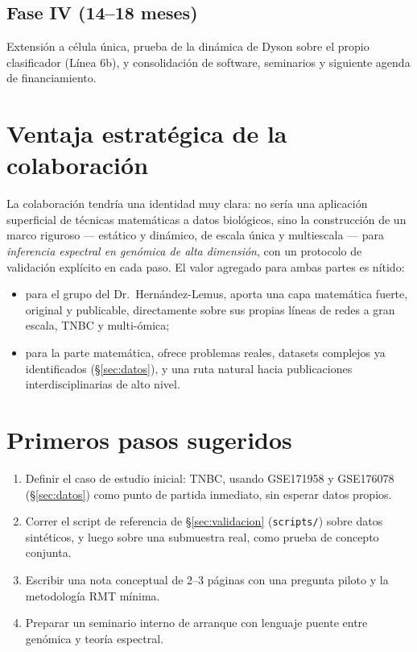 \documentclass[11pt]{article}
\begin{document}
\subsection*{Fase IV (14--18 meses)}
Extensión a célula única, prueba de la dinámica de Dyson sobre el propio clasificador (Línea 6b), y consolidación de software, seminarios y siguiente agenda de financiamiento.

\section{Ventaja estratégica de la colaboración}
La colaboración tendría una identidad muy clara: no sería una aplicación superficial de técnicas matemáticas a datos biológicos, sino la construcción de un marco riguroso --- estático y dinámico, de escala única y multiescala --- para \emph{inferencia espectral en genómica de alta dimensión}, con un protocolo de validación explícito en cada paso. El valor agregado para ambas partes es nítido:
\begin{itemize}
    \item para el grupo del Dr.\ Hernández-Lemus, aporta una capa matemática fuerte, original y publicable, directamente sobre sus propias líneas de redes a gran escala, TNBC y multi-ómica;
    \item para la parte matemática, ofrece problemas reales, datasets complejos ya identificados (\S\ref{sec:datos}), y una ruta natural hacia publicaciones interdisciplinarias de alto nivel.
\end{itemize}

\section{Primeros pasos sugeridos}
\begin{enumerate}[label=\arabic*.]
    \item Definir el caso de estudio inicial: TNBC, usando GSE171958 y GSE176078 (\S\ref{sec:datos}) como punto de partida inmediato, sin esperar datos propios.
    \item Correr el script de referencia de \S\ref{sec:validacion} (\texttt{scripts/}) sobre datos sintéticos, y luego sobre una submuestra real, como prueba de concepto conjunta.
    \item Escribir una nota conceptual de 2--3 páginas con una pregunta piloto y la metodología RMT mínima.
    \item Preparar un seminario interno de arranque con lenguaje puente entre genómica y teoría espectral.
\end{enumerate}
\end{document}
